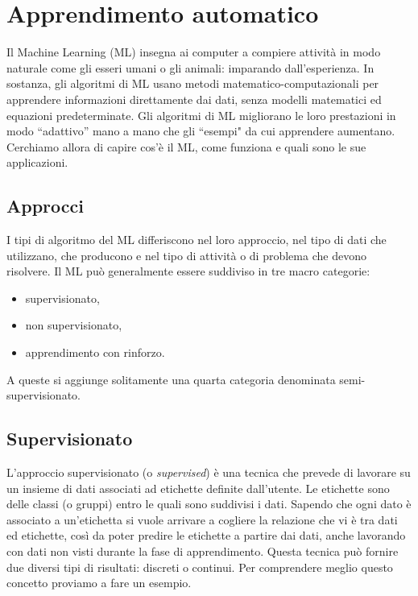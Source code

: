\documentclass[12pt,italian]{report}
\begin{document}
\chapter{Apprendimento automatico}
\label{cap:apprendimento_automatico}
Il Machine Learning (ML) insegna ai computer a compiere attività in modo naturale come gli esseri umani o gli animali: imparando dall’esperienza. In sostanza, gli algoritmi di ML usano metodi matematico-computazionali per apprendere informazioni direttamente dai dati, senza modelli matematici ed equazioni predeterminate. Gli algoritmi di ML migliorano le loro prestazioni in modo ``adattivo” mano a mano che gli ``esempi" da cui apprendere aumentano. Cerchiamo allora di capire cos’è il ML, come funziona e quali sono le sue applicazioni.
\section{Approcci}
\label{sec:approcci}

I tipi di algoritmo del ML differiscono nel loro approccio, nel tipo di dati che utilizzano, che producono e nel tipo di attività o di problema che devono risolvere. Il ML può generalmente essere suddiviso in tre macro categorie: 
\begin{itemize}
	\item supervisionato,
	\item non supervisionato,
	\item apprendimento con rinforzo.
\end{itemize}
A queste si aggiunge solitamente una quarta categoria denominata semi-supervisionato.


\section{Supervisionato}

L'approccio supervisionato (o \emph{supervised}) è una tecnica che prevede di lavorare su un insieme di dati associati ad etichette definite dall'utente. Le etichette sono delle classi (o gruppi) entro le quali sono suddivisi i dati. Sapendo che ogni dato è associato a un'etichetta si vuole arrivare a cogliere la relazione che vi è tra dati ed etichette, così da poter predire le etichette a partire dai dati, anche lavorando con dati non visti durante la fase di apprendimento.
Questa tecnica può fornire due diversi tipi di risultati: discreti o continui. Per comprendere meglio questo concetto proviamo a fare un esempio.
\end{document}
